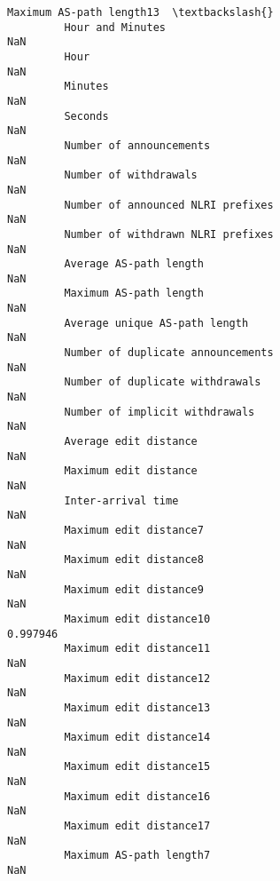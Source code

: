 \documentclass[11pt]{article}
\begin{document}
\begin{Verbatim}[commandchars=\\\{\}]
                                                            Maximum AS-path length13  \textbackslash{}
         Hour and Minutes                                                        NaN   
         Hour                                                                    NaN   
         Minutes                                                                 NaN   
         Seconds                                                                 NaN   
         Number of announcements                                                 NaN   
         Number of withdrawals                                                   NaN   
         Number of announced NLRI prefixes                                       NaN   
         Number of withdrawn NLRI prefixes                                       NaN   
         Average AS-path length                                                  NaN   
         Maximum AS-path length                                                  NaN   
         Average unique AS-path length                                           NaN   
         Number of duplicate announcements                                       NaN   
         Number of duplicate withdrawals                                         NaN   
         Number of implicit withdrawals                                          NaN   
         Average edit distance                                                   NaN   
         Maximum edit distance                                                   NaN   
         Inter-arrival time                                                      NaN   
         Maximum edit distance7                                                  NaN   
         Maximum edit distance8                                                  NaN   
         Maximum edit distance9                                                  NaN   
         Maximum edit distance10                                            0.997946   
         Maximum edit distance11                                                 NaN   
         Maximum edit distance12                                                 NaN   
         Maximum edit distance13                                                 NaN   
         Maximum edit distance14                                                 NaN   
         Maximum edit distance15                                                 NaN   
         Maximum edit distance16                                                 NaN   
         Maximum edit distance17                                                 NaN   
         Maximum AS-path length7                                                 NaN   

\end{Verbatim}
\end{document}
